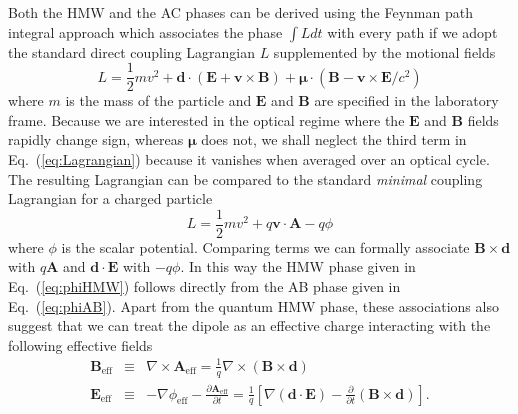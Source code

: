 \documentclass[twocolumn,english,pra,aps,superscriptaddress,floatfix]{revtex4-1}
\begin{document}
Both the HMW and the AC phases can be derived using the Feynman path integral approach which associates the phase $\int L dt$ with every path if we adopt the standard direct coupling Lagrangian $L$ supplemented by the motional fields
\begin{equation}
L=\frac{1}{2}m v^2 +  \mathbf{d} \cdot (\mathbf{E}+ \mathbf{v}\times \mathbf{B})+ \boldsymbol{\mu} \cdot (\mathbf{B}- \mathbf{v}\times \mathbf{E}/c^2)  
\label{eq:Lagrangian}
\end{equation}
where $m$ is the mass of the particle and $\mathbf{E}$ and $\mathbf{B}$ are specified in the laboratory frame.  Because we are interested in the optical regime where the $\mathbf{E}$ and $\mathbf{B}$ fields rapidly change sign, whereas $\mathbf{\mu}$ does not, we shall neglect the third term in Eq.\ (\ref{eq:Lagrangian}) because it vanishes when averaged over an optical cycle. The resulting Lagrangian can be compared to the standard \emph{minimal} coupling Lagrangian for a charged particle 
\begin{equation}
L=\frac{1}{2}m v^2 +  q  \mathbf{v} \cdot \mathbf{A} - q \phi
\end{equation}
where $\phi$ is the scalar potential. Comparing terms we can formally associate $\mathbf{B} \times \mathbf{d}$ with $q \mathbf {A}$ and $\mathbf{d} \cdot \mathbf{E}$ with $-q \phi$. In this way the HMW phase given in Eq.\ (\ref{eq:phiHMW}) follows directly from the AB phase given in Eq.\ (\ref{eq:phiAB}). Apart from the quantum HMW phase, these associations also suggest that we can treat the dipole as an effective charge interacting with the following effective fields
\begin{eqnarray}
\mathbf{B}_{\mathrm{eff}}  & \equiv & \nabla \times \mathbf{A}_{\mathrm{eff}} = \frac{1}{q} \nabla \times (\mathbf{B} \times \mathbf{d}) \label{eq:Beff} \\
\mathbf{E}_{\mathrm{eff}}  & \equiv & - \nabla \phi_{\mathrm{eff}} - \frac{\partial \mathbf{A}_{\mathrm{eff}} }{\partial t} = \frac{1}{q} \left[ \nabla (\mathbf{d} \cdot \mathbf{E}) - \frac{\partial}{\partial t} (\mathbf{B} \times \mathbf{d}) \right] . \label{eq:Eeff}
\end{eqnarray}
\end{document}
